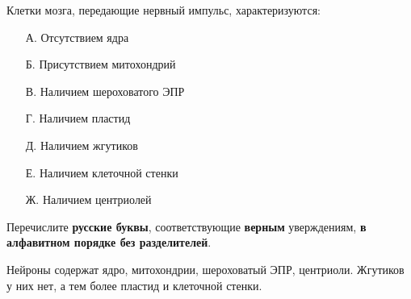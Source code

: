
Клетки мозга, передающие нервный импульс, характеризуются:
\begin{enumerate}
    \item[А.] Отсутствием ядра
    \item[Б.] Присутствием митохондрий
    \item[В.] Наличием шероховатого ЭПР
    \item[Г.] Наличием пластид
    \item[Д.] Наличием жгутиков
    \item[Е.] Наличием клеточной стенки
    \item[Ж.] Наличием центриолей
\end{enumerate} 

Перечислите \textbf{русские буквы}, соответствующие \textbf{верным} уверждениям, \textbf{в алфавитном порядке без разделителей}.

\commentsSection

Нейроны содержат ядро, митохондрии, шероховатый ЭПР, центриоли. Жгутиков у них нет, а тем более пластид и клеточной стенки.

